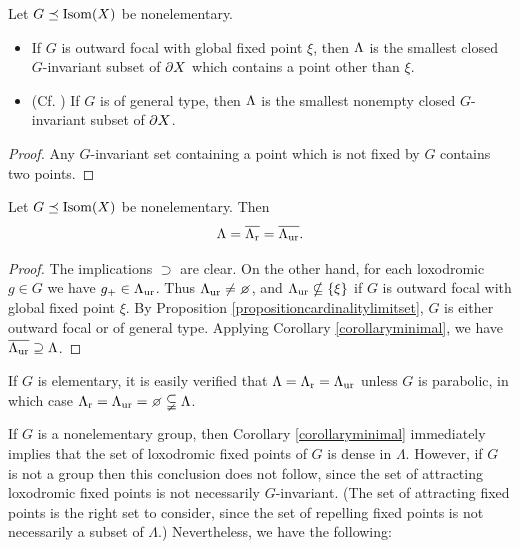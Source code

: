 \begin{corollary}
\label{corollaryminimal}
Let $G\preceq\operatorname{Isom}(X)$ be nonelementary.
\begin{itemize}
\item[(i)] If $G$ is outward focal with global fixed point $\xi$, then $\Lambda$ is the smallest closed $G$-invariant subset of $\partial X$ which contains a point other than $\xi$.
\item[(ii)] (Cf. {\cite[Theorem 5.3.7]{Beardon_book}}) If $G$ is of general type, then $\Lambda$ is the smallest nonempty closed $G$-invariant subset of $\partial X$.
\end{itemize}
\end{corollary}
\begin{proof}
Any $G$-invariant set containing a point which is not fixed by $G$ contains two points.
\end{proof}

\begin{corollary}
Let $G\preceq\operatorname{Isom}(X)$ be nonelementary. Then
\[
\Lambda = \overline{\Lambda_{\mathrm r}} = \overline{\Lambda_{\mathrm{ur}}}.
\]
\end{corollary}
\begin{proof}
The implications $\supset$ are clear. On the other hand, for each loxodromic $g\in G$ we have $g_+\in\Lambda_{\mathrm{ur}}$. Thus $\Lur\neq\emptyset$, and $\Lambda_{\mathrm{ur}}\nsubseteq\{\xi\}$ if $G$ is outward focal with global fixed point $\xi$. By Proposition \ref{propositioncardinalitylimitset}, $G$ is either outward focal or of general type. Applying Corollary \ref{corollaryminimal}, we have $\overline{\Lambda_{\mathrm{ur}}}\supseteq\Lambda$.
\end{proof}

\begin{remark}
If $G$ is elementary, it is easily verified that $\Lambda = \Lambda_{\mathrm r} = \Lambda_{\mathrm{ur}}$ unless $G$ is parabolic, in which case $\Lr = \Lur = \emptyset \propersubset \Lambda$.
\end{remark}

If $G$ is a nonelementary group, then Corollary \ref{corollaryminimal} immediately implies that the set of loxodromic fixed points of $G$ is dense in $\Lambda$. However, if $G$ is not a group then this conclusion does not follow, since the set of attracting loxodromic fixed points is not necessarily $G$-invariant. (The set of attracting fixed points is the right set to consider, since the set of repelling fixed points is not necessarily a subset of $\Lambda$.) Nevertheless, we have the following:

